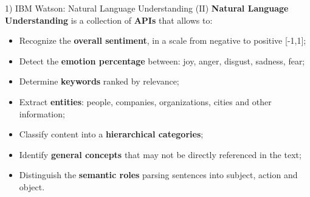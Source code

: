\documentclass[xcolor=dvipsnames]{beamer}
\begin{document}
\begin{frame}{1) IBM Watson: Natural Language Understanding (II)}
\textbf{Natural Language Understanding} is a collection of \textbf{APIs} that allows to:\cite{p1}\\
\begin{itemize}
\item Recognize the \textbf{overall sentiment}, in a scale from negative to positive [-1,1];
\item Detect the \textbf{emotion percentage} between: joy, anger, disgust, sadness, fear;
\item Determine \textbf{keywords} ranked by relevance;
\item Extract \textbf{entities}: people, companies, organizations, cities and other information;
\item Classify content into a \textbf{hierarchical categories};
\item Identify \textbf{general concepts} that may not be directly referenced in the text;
\item Distinguish the \textbf{semantic roles} parsing sentences into subject, action and object.
\end{itemize}
\end{frame}
\end{document}
